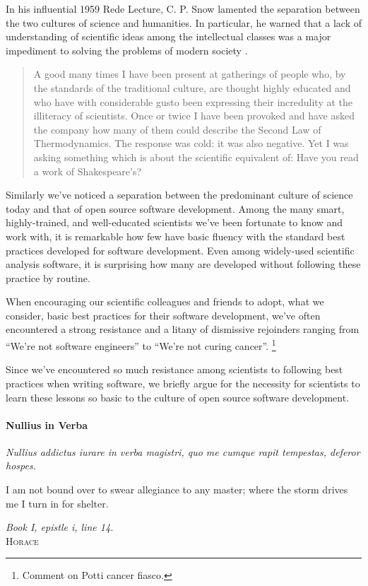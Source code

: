 \documentclass[ChapterTOCs,krantz2]{krantz} %
\begin{document}
In his influential 1959 Rede Lecture, C. P. Snow lamented the separation between the
two cultures of science and humanities.  In particular, he warned that a lack
of understanding of scientific ideas among the intellectual classes was a major
impediment to solving the problems of modern society \cite{snow1960two}.

\begin{quote}
A good many times I have been present at gatherings of people who, by the
standards of the traditional culture, are thought highly educated and who have
with considerable gusto been expressing their incredulity at the illiteracy of
scientists. Once or twice I have been provoked and have asked the company how
many of them could describe the Second Law of Thermodynamics. The response was
cold: it was also negative. Yet I was asking something which is about the
scientific equivalent of: Have you read a work of Shakespeare’s?
\end{quote}

Similarly we've noticed a separation between the predominant culture of
science today and that of open source software development. Among the
many smart, highly-trained, and well-educated scientists we've been
fortunate to know and work with, it is remarkable how few have basic
fluency with the standard best practices developed for software development.
Even among widely-used scientific analysis software, it is surprising how
many are developed without following these practice by routine.

When encouraging our scientific colleagues and friends to adopt, what we
consider, basic best practices for their software development, we've often
encountered a strong resistance and a litany of dismissive rejoinders ranging
from ``We're not software engineers'' to ``We're not curing cancer''.%
\footnote{Comment on Potti cancer fiasco.}

Since we've encountered so much resistance among scientists to following best
practices when writing software, we briefly argue for the necessity for
scientists to learn these lessons so basic to the culture of open source
software development.

\paragraph{ {\bf Nullius in Verba}} 

\setlength{\epigraphrule}{0pt}
\setlength{\epigraphwidth}{.65\textwidth}
\epigraph%
{%
  \emph{Nullius addictus iurare in verba magistri,
  quo me cumque rapit tempestas, deferor hospes.}

  I am not bound over to swear allegiance to any master; where the storm
  drives me I turn in for shelter.
}%
{\textit{Book I, epistle i, line 14.}\\ \textsc{Horace} }
\end{document}
